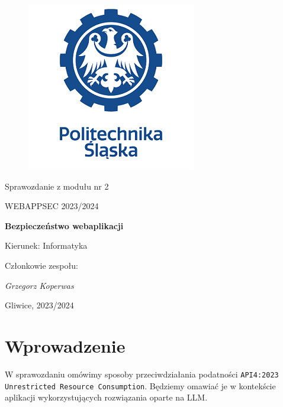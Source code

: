 \documentclass[12pt,a4paper]{article}
\begin{document}
\renewcommand\thesection{\arabic{section}.}
\renewcommand\thesubsection{\arabic{section}.\arabic{subsection}.}
\renewcommand\thesubsubsection{\arabic{section}.\arabic{subsection}.\arabic{subsubsection}.}

\clearpage
\begin{figure}[h]
\centering
\includegraphics{media/ps-logo.png}
\end{figure}
\hspace{3cm}
\begin{center}Sprawozdanie z modułu nr 2\end{center}
\begin{center}WEBAPPSEC 2023/2024\end{center}
\hspace{3cm}
\begin{center}\large\textbf{Bezpieczeństwo webaplikacji}\end{center}
\hspace{7cm}
\begin{flushright}Kierunek: Informatyka
\end{flushright}
\begin{flushright}Członkowie zespołu:
\par
\textit{Grzegorz Koperwas}
\end{flushright}
\vfill
\begin{center}Gliwice, 2023/2024\end{center}

\newpage
{}
\tableofcontents

\newpage

\section{Wprowadzenie}

W sprawozdaniu omówimy sposoby przeciwdziałania podatności \texttt{API4:2023
Unrestricted Resource Consumption}. Będziemy omawiać je w kontekście aplikacji 
wykorzystujących rozwiązania oparte na LLM.
\end{document}
